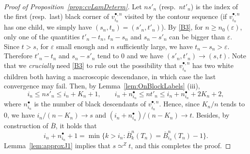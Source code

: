 \documentclass[AHL,XML,longabstracts,Unicode]{cedram}
\def\eps{\varepsilon}
\def\oB{\overline{B}}
\begin{document}
\begin{proof}[Proof of Proposition~\ref{prop:cvLamDeterm}]
Let $n s'_{n}$ (resp.~$n t'_{n}$) is the index of the first (resp.~last) black corner of $v^{\bullet,n}_{i_{n}}$ visited by the contour sequence (if $v^{\bullet,n}_{i_{n}}$ has one child, we simply have $(s_{n},t_{n})=(s'_{n},t'_{n})$).
By \ref{B3}, for $n \ge n_0(\eps)$, only one of the quantities $t'_n-t_n$, $t_n-s_n$ and $s_n-s'_n$
can be bigger than $\eps$.
Since $t>s$, for $\eps$ small enough and $n$ sufficiently large, we have $t_n-s_n>\eps$.
Therefore $t'_n-t_n$ and $s_n-s'_n$ tend to $0$ and
we have $(s'_{n},t'_{n}) \rightarrow (s,t)$.
Note that we \emph{crucially} need \ref{B3} to rule out the possibility that  $v^{\bullet,n}_{i_{n}}$ has two white children both having a macroscopic descendance, in which case the last convergence may fail.
Then, by Lemma~\ref{lem:OnBlockLabels}   (iii),
  \[ i_{n} \leq n s'_{n} \leq i_{n}+  K_{n}+1, \qquad i_{n}+n^{\bullet}_{i_{n}} \leq n t'_{n} \leq   i_{n}+n^{\bullet}_{i_{n}} +2 K_{n}+2,\]
where $n^{\bullet}_{i_{n}}$ is the number of black descendants of $ v^{\bullet,n}_{i_{n}}$.
Hence, since $K_n/n$ tends to $0$, we have $i_{n}/(n-K_{n}) \rightarrow s$ and $  (i_{n}+n^{\bullet}_{i_{n}})/(n-K_{n}) \rightarrow t$.
Besides, by construction of $\overline{B}$, it holds that
\[i_{n}+n^{\bullet}_{i_{n}}+1= \min \{k>i_{n}: \oB^{n}_{k}(T_{n}) =  \oB^{n}_{i_{n}}(T_{n})-1\}.\]
Lemma~\ref{lem:approxJ1} implies that $s \simeq^Z t$, and this completes the proof.
\end{proof}
\end{document}
